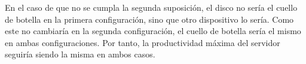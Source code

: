 \begin{ejercicio}
\begin{enumerate}
        En el caso de que no se cumpla la segunda suposición, el disco no sería el cuello de botella en la primera configuración, sino que otro dispositivo lo sería. Como este no cambiaría en la segunda configuración, el cuello de botella sería el mismo en ambas configuraciones. Por tanto, la productividad máxima del servidor seguiría siendo la misma en ambos casos.
    \end{enumerate}
\end{ejercicio}
\begin{comment}
\solucion
    \begin{enumerate}
        \item En el primer caso la demanda del disco es $36 \times 0.03 = 1.08$ segundos; en el segundo, la demanda de cualquiera de los tres discos es $12 \times 0.09 = 1.08$ segundos. Como ningún otro dispositivo tiene una demanda de servicio mayor (ya que el resto de dispositivos es idéntico en ambas configuraciones) también los discos son los cuellos de botella en la segunda configuración. Por tanto, en ambos casos la productividad máxima del servidor viene determinada por la inversa de la demanda de servicio de los discos, es decir, $0.93$ tr/s. Por tanto, las dos opciones ofrecen la misma productividad máxima.
        \item En ese caso, otro dispositivo sería el cuello de botella, pero sería exactamente el mismo dispositivo en ambas configuraciones por lo que, nuevamente, las dos opciones ofrecerían la misma productividad máxima.
    \end{enumerate}
\end{comment}


